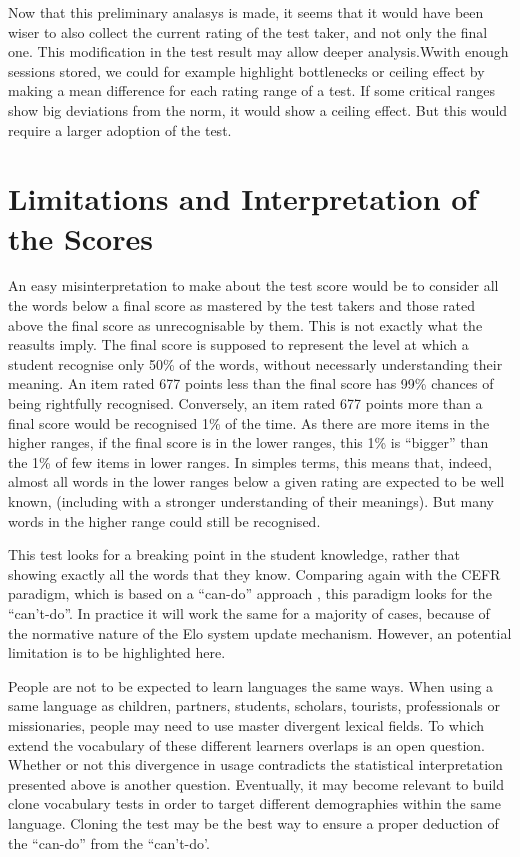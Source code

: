 Now that this preliminary analasys is made, it seems that it would have been wiser to also collect the current rating of the test taker, and not only the final one. This modification in the test result may allow deeper analysis.Wwith enough sessions stored, we could for example highlight bottlenecks or ceiling effect by making a mean difference for each rating range of a test. If some critical ranges show big deviations from the norm, it would show a ceiling effect. But this would require a larger adoption of the test.

\section{Limitations and Interpretation of the Scores}
An easy misinterpretation to make about the test score would be to consider all the words below a final score as mastered by the test takers and those rated above the final score as unrecognisable by them. This is not exactly what the reasults imply. The final score is supposed to represent the level at which a student recognise only 50\% of the words, without necessarly understanding their meaning. An item rated 677 points less than the final score has 99\% chances of being rightfully recognised. Conversely, an item rated 677 points more than a final score would be recognised 1\% of the time. As there are more items in the higher ranges, if the final score is in the lower ranges, this 1\% is ``bigger'' than the 1\% of few items in lower ranges. In simples terms, this means that, indeed, almost all words in the lower ranges below a given rating are expected to be well known, (including with a stronger understanding of their meanings). But many words in the higher range could still be recognised.

This test looks for a breaking point in the student knowledge, rather that showing exactly all the words that they know. Comparing again with the CEFR paradigm, which is based on a ``can-do'' approach \parencite{europe_common_2020}, this paradigm looks for the ``can't-do''. In practice it will work the same for a majority of cases, because of the normative nature of the Elo system update mechanism. However, an potential limitation is to be highlighted here.

People are not to be expected to learn languages the same ways. When using a same language as children, partners, students, scholars, tourists, professionals or missionaries, people may need to use master divergent lexical fields. To which extend the vocabulary of these different learners overlaps is an open question. Whether or not this divergence in usage contradicts the statistical interpretation presented above is another question. Eventually, it may become relevant to build clone vocabulary tests in order to target different demographies within the same language. Cloning the test may be the best way to ensure a proper deduction of the ``can-do'' from the ``can't-do'.

